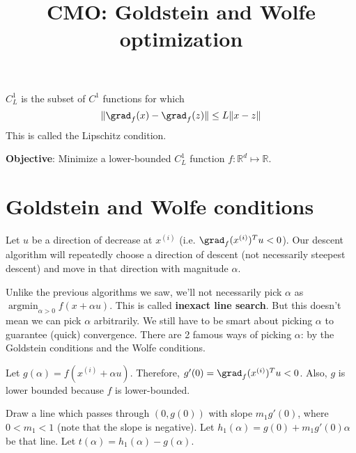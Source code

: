 


\title{CMO: Goldstein and Wolfe optimization}



\maketitle
\initMinimal{}

\begin{definition}
$C^1_L$ is the subset of $C^1$ functions for which
\[ \| \grad_f(x) - \grad_f(z) \| \le L\|x-z\| \]
This is called the Lipschitz condition.
\end{definition}

\textbf{Objective}: Minimize a lower-bounded $C^1_L$ function $f: \mathbb{R}^d \mapsto \mathbb{R}$.

\section{Goldstein and Wolfe conditions}

Let $u$ be a direction of decrease at $x^{(i)}$ (i.e. $\grad_f(x^{(i)})^Tu < 0$).
Our descent algorithm will repeatedly choose a direction of descent
(not necessarily steepest descent) and move in that direction with magnitude $\alpha$.

Unlike the previous algorithms we saw, we'll not necessarily pick $\alpha$
as $\operatorname{argmin}_{\alpha > 0} f(x + \alpha u)$.
This is called \textbf{inexact line search}.
But this doesn't mean we can pick $\alpha$ arbitrarily.
We still have to be smart about picking $\alpha$ to guarantee (quick) convergence.
There are 2 famous ways of picking $\alpha$: by the Goldstein conditions
and the Wolfe conditions.

Let $g(\alpha) = f(x^{(i)} + \alpha u)$.
Therefore, $g'(0) = \grad_f(x^{(i)})^Tu < 0$.
Also, $g$ is lower bounded because $f$ is lower-bounded.

Draw a line which passes through $(0, g(0))$ with slope $m_1 g'(0)$, where $0 < m_1 < 1$
(note that the slope is negative).
Let $h_1(\alpha) = g(0) + m_1 g'(0) \alpha$ be that line.
Let $t(\alpha) = h_1(\alpha) - g(\alpha)$.


